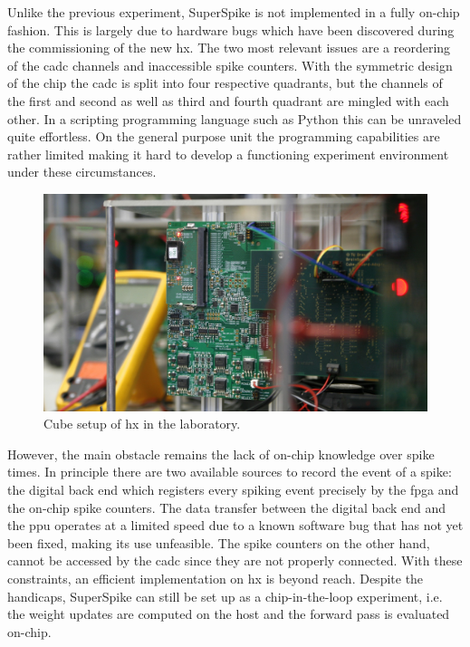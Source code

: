 Unlike the previous experiment, SuperSpike is not implemented in a fully on-chip fashion. This is largely due to hardware bugs which have been discovered during the commissioning of the new \gls{hx}. The two most relevant issues are a reordering of the \gls{cadc} channels and inaccessible spike counters. With the symmetric design of the chip the \gls{cadc} is split into four respective quadrants, but the channels of the first and second as well as third and fourth quadrant are mingled with each other. In a scripting programming language such as Python this can be unraveled quite effortless. On the general purpose unit the programming capabilities are rather limited making it hard to develop a functioning experiment environment under these circumstances.

\begin{figure}[htb!]
	\centering
	\includegraphics[width=\textwidth]{figures/hxsetup_img2.jpg}
	\caption[Cube setup of \gls{hx}.]{Cube setup of \gls{hx} in the laboratory.}
	\label{cubesetupinlab}
\end{figure}

However, the main obstacle remains the lack of on-chip knowledge over spike times. In principle there are two available sources to record the event of a spike: the digital back end which registers every spiking event precisely by the \gls{fpga} and the on-chip spike counters. The data transfer between the digital back end and the \gls{ppu} operates at a limited speed due to a known software bug that has not yet been fixed, making its use unfeasible. The spike counters on the other hand, cannot be accessed by the \gls{cadc} since they are not properly connected. With these constraints, an efficient implementation on \gls{hx} is beyond reach. Despite the handicaps, SuperSpike can still be set up as a chip-in-the-loop experiment, i.e. the weight updates are computed on the host and the forward pass is evaluated on-chip. 



